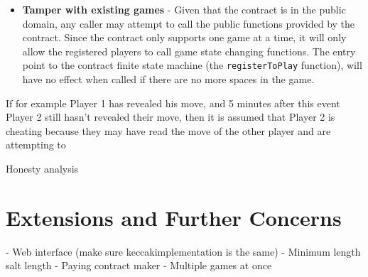 \documentclass[a4paper, twoside]{article}
\begin{document}
\begin{itemize}
	\item \textbf{Tamper with existing games} - Given that the contract is in the public domain, any caller may attempt to call the public functions provided by the contract. Since the contract only supports one game at a time, it will only allow the registered players to call game state changing functions. The entry point to the contract finite state machine (the \texttt{registerToPlay} function), will have no effect when called if there are no more spaces in the game. 
\end{itemize}



If for example Player 1 has revealed his move, and 5 minutes after this event Player 2 still hasn't revealed their move, then it is assumed that Player 2 is cheating because they may have read the move of the other player and are attempting to 

Honesty analysis

\section{Extensions and Further Concerns}
	- Web interface (make sure keccakimplementation is the same)
	- Minimum length salt length
	- Paying contract maker
	- Multiple games at once
	
%






%
%

%
%


%
%
\end{document}
